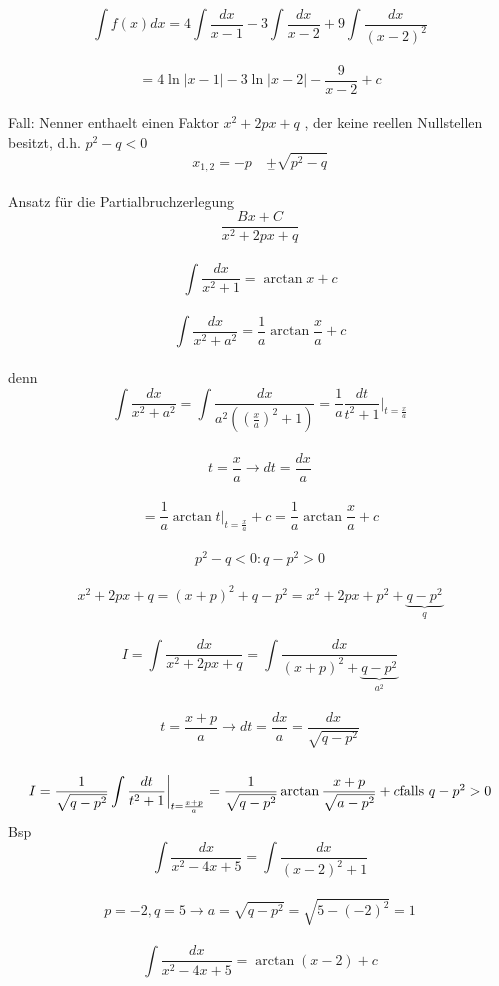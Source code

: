 \documentclass[fleqn,a4paper]{scrartcl}
\begin{document}
\[
\int f(x) dx = 4 \int \frac{dx}{x-1} -3 \int \frac{dx}{x-2} + 9 \int \frac{dx}{(x-2)^2} \] \\ \[
= 4 \ln \vert x-1 \vert -3 \ln \vert x-2 \vert - \frac{9}{x-2} +c \] \\ Fall: Nenner enthaelt einen Faktor $ x^2 + 2px + q $ , der keine reellen Nullstellen besitzt, d.h. $ p^2 -q < 0 $ \\ \[ x_{1,2} = -p \quad \underset {-} {+} \sqrt{p^2 -q} \] \\ Ansatz für die Partialbruchzerlegung \\ \[ \frac{Bx+C}{x^2+2px+q} \] \\ \[
\int \frac{dx}{x^2+1} = \arctan x +c \] \\ \[
\int \frac{dx}{x^2+a^2} = \frac{1}{a} \arctan \frac{x}{a} +c \] \\ denn \[ \int \frac{dx}{x^2 + a^2} = \int \frac{dx}{a^2 ((\frac{x}{a})^2 + 1 )} = \frac{1}{a} \frac{dt}{t^2+1} \bigg \vert _{t=\frac{x}{a} } \] \\ \[ t= \frac{x}{a} \rightarrow dt = \frac{dx}{a} \] \\ \[ = \frac{1}{a} \arctan t \bigg \vert _{t=\frac{x}{a}} +c = \frac{1}{a} \arctan \frac{x}{a} +c \] \\ \[
p^2 -q < 0 : q-p^2>0 \] \\ \[
x^2+2px+q = (x+p)^2 +q -p^2 =x^2+2px+p^2+ \underbrace {q-p^2}_{q} \] \\ \[ 
I = \int \frac{dx}{x^2+2px+q} = \int \frac{dx}{(x+p)^2 + \underbrace{q-p^2}_{a^2}} \] \\ \[
t= \frac{x+p}{a} \rightarrow dt = \frac{dx}{a} = \frac{dx}{\sqrt{q-p^2}} \] \\ \[ 
I= \frac{1}{\sqrt{q-p^2}} \int \frac{dt}{t^2+1} \bigg \vert _{t=\frac{x+p}{a}} = \frac{1}{\sqrt{q-p^2}} \arctan \frac{x+p}{\sqrt{a-p^2}} +c $ \\ falls $ q-p^2 >0 \]  Bsp \[ 
\int \frac{dx}{x^2-4x+5} = \int \frac{dx}{(x-2)^2+1} \] \\ \[
p=-2, q=5 \rightarrow a= \sqrt{q-p^2} = \sqrt{5-(-2)^2} = 1 \] \\ \[
\int \frac{dx}{x^2-4x+5} = \arctan(x-2) +c
\]
\end{document}
